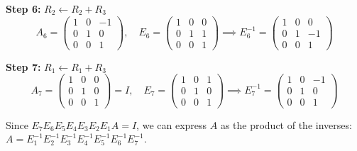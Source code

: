 \documentclass[12pt,a3paper]{article}
\begin{document}
\begin{tcolorbox}
\textbf{Step 6:} $R_2 \leftarrow R_2 + R_3$
\[
A_6 = \begin{pmatrix}1&0&-1\\0&1&0\\0&0&1\end{pmatrix}, \quad
E_6 = \begin{pmatrix}1&0&0\\0&1&1\\0&0&1\end{pmatrix} \implies E_6^{-1} = \begin{pmatrix}1&0&0\\0&1&-1\\0&0&1\end{pmatrix}
\]

\textbf{Step 7:} $R_1 \leftarrow R_1 + R_3$
\[
A_7 = \begin{pmatrix}1&0&0\\0&1&0\\0&0&1\end{pmatrix} = I, \quad
E_7 = \begin{pmatrix}1&0&1\\0&1&0\\0&0&1\end{pmatrix} \implies E_7^{-1} = \begin{pmatrix}1&0&-1\\0&1&0\\0&0&1\end{pmatrix}
\]

\medskip
Since $E_7 E_6 E_5 E_4 E_3 E_2 E_1 A = I$, we can express $A$ as the product of the inverses:
$A = E_1^{-1} E_2^{-1} E_3^{-1} E_4^{-1} E_5^{-1} E_6^{-1} E_7^{-1}$.


\end{tcolorbox}
\end{document}
